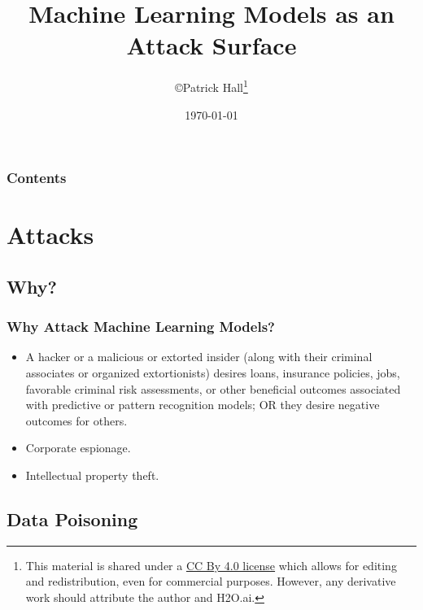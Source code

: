 \documentclass[11pt,
               aspectratio=169,
               hyperref={colorlinks}
               ]{beamer}
\author{\copyright\hspace{1pt}Patrick Hall\footnote{\tiny{This material is shared under a \href{https://creativecommons.org/licenses/by/4.0/deed.ast}{CC By 4.0 license} which allows for editing and redistribution, even for commercial purposes. However, any derivative work should attribute the author and H2O.ai.}}}
\title{Machine Learning Models as an Attack Surface}
\institute{\href{https://www.h2o.ai}{H\textsubscript{2}O.ai}}
\date{\today}
\begin{document}
	
	\maketitle
	
	\begin{frame}
	
		\frametitle{Contents}
		
		\tableofcontents{}
		
	\end{frame}

	\section{Attacks}

		\subsection{Why?}

			\begin{frame}
		
				\frametitle{Why Attack Machine Learning Models?}
				\begin{itemize}
					\item A hacker or a malicious or extorted insider (along with their criminal associates or organized extortionists) desires loans, insurance policies, jobs, favorable criminal risk assessments, or other beneficial outcomes associated with predictive or pattern recognition models; OR they desire negative outcomes for others.
					\item Corporate espionage.
					\item Intellectual property theft.
				\end{itemize}
			\end{frame}

		\subsection{Data Poisoning}
\end{document}
